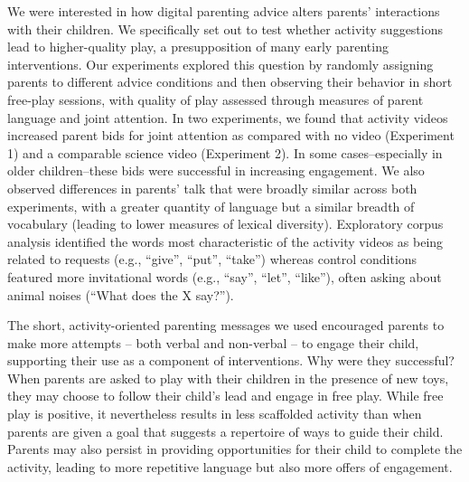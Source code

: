\documentclass[man,floatsintext]{apa6}
\begin{document}
We were interested in how digital parenting advice alters parents' interactions with their children.
We specifically set out to test whether activity suggestions lead to higher-quality play, a presupposition of many early parenting interventions.
Our experiments explored this question by randomly assigning parents to different advice conditions and then observing their behavior in short free-play sessions, with quality of play assessed through measures of parent language and joint attention.
In two experiments, we found that activity videos increased parent bids for joint attention as compared with no video (Experiment 1) and a comparable science video (Experiment 2).
In some cases--especially in older children--these bids were successful in increasing engagement.
We also observed differences in parents' talk that were broadly similar across both experiments, with a greater quantity of language but a similar breadth of vocabulary (leading to lower measures of lexical diversity).
Exploratory corpus analysis identified the words most characteristic of the activity videos as being related to requests (e.g., \enquote{give}, \enquote{put}, \enquote{take}) whereas control conditions featured more invitational words (e.g., \enquote{say}, \enquote{let}, \enquote{like}), often asking about animal noises (\enquote{What does the X say?}).

The short, activity-oriented parenting messages we used encouraged parents to make more attempts -- both verbal and non-verbal -- to engage their child, supporting their use as a component of interventions.
Why were they successful?
When parents are asked to play with their children in the presence of new toys, they may choose to follow their child's lead and engage in free play.
While free play is positive, it nevertheless results in less scaffolded activity than when parents are given a goal that suggests a repertoire of ways to guide their child.
Parents may also persist in providing opportunities for their child to complete the activity, leading to more repetitive language but also more offers of engagement.
\end{document}

